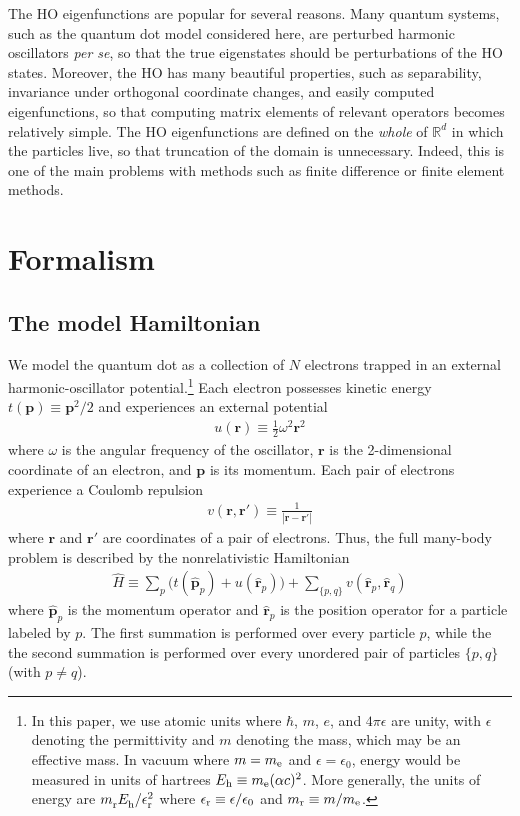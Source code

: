 \documentclass[amsmath, amssymb, aps, floatfix, nofootinbib, preprintnumbers,showpacs, superscriptaddress, twocolumn]{revtex4-1}
\begin{document}
The HO eigenfunctions are popular for several reasons. Many quantum
systems, such as the quantum dot model considered here, are perturbed
harmonic oscillators \emph{per se}, so that the true eigenstates
should be perturbations of the HO states. Moreover, the HO has many
beautiful properties, such as separability, invariance under
orthogonal coordinate changes, and easily computed eigenfunctions, so
that computing matrix elements of relevant operators becomes
relatively simple. The HO eigenfunctions are defined on the
\emph{whole} of $\mathbb{R}^d$ in which the particles live, so that
truncation of the domain is unnecessary. Indeed, this is one of the
main problems with methods such as finite difference or finite element
methods.\cite{RamMohan2002}


\section{Formalism}
\label{sec:formalism}

\subsection{The model Hamiltonian}
\label{subsec:modelHamiltonian}

We model the quantum dot as a collection of $N$ electrons trapped in an
external harmonic-oscillator potential.\footnote{In this paper, we use atomic
  units where $\hbar$, $m$, $e$, and $4 \pi \epsilon$ are unity, with
  $\epsilon$ denoting the permittivity and $m$ denoting the mass, which may be
  an effective mass.  In vacuum where $m = m_{\text e}$ and
  $\epsilon = \epsilon_0$, energy would be measured in units of hartrees
  $E_{\text h} \equiv m_{\text e} (\alpha c)^2$.  More generally, the units of
  energy are $m_{\text r \vphantom h}^{} E_{\text h}^{} /
  \epsilon_{\text r \vphantom h}^2$ where
  $\epsilon_{\text r} \equiv \epsilon / \epsilon_0$ and
  $m_{\text r} \equiv m / m_{\text e}$.}  Each electron possesses kinetic
energy $t(\bm p) \equiv \bm p^2 / 2$ and experiences an external potential
\begin{align*}
  u(\bm r) \equiv \frac{1}{2} \omega^2 \bm r^2
\end{align*}
where $\omega$ is the angular frequency of the oscillator, $\bm r$ is the
2-dimensional coordinate of an electron, and $\bm p$ is its momentum.  Each
pair of electrons experience a Coulomb repulsion
\begin{align*}
  v(\bm r, \bm r') \equiv \frac{1}{|\bm r - \bm r'|}
\end{align*}
where $\bm r$ and $\bm r'$ are coordinates of a pair of electrons.  Thus, the
full many-body problem is described by the nonrelativistic Hamiltonian
\begin{align*}
  \hat H \equiv \sum_{p} \bigl(
  t(\hat{\bm p}_p) + u(\hat{\bm r}_p)
  \bigr) + \sum_{\{p, q\}} v(\hat{\bm r}_p, \hat{\bm r}_q)
\end{align*}
where $\hat{\bm p}_p$ is the momentum operator and $\hat{\bm r}_p$ is the
position operator for a particle labeled by $p$.  The first summation is
performed over every particle $p$, while the the second summation is performed
over every unordered pair of particles $\{ p, q \}$ (with $p \ne q$).
\end{document}
